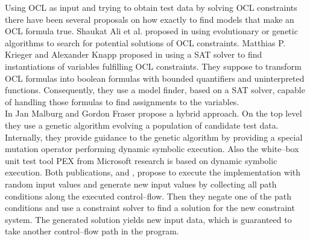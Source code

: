 \documentclass[runningheads,a4paper]{llncs}%
\begin{document}
Using OCL as input and trying to obtain test data by solving OCL constraints there have been several proposals on how exactly to find models that make an OCL formula true. Shaukat Ali et al. proposed in \cite{ali2011search} using evolutionary or genetic algorithms to search for potential solutions of OCL constraints. Matthias P. Krieger and Alexander Knapp proposed in \cite{krieger2008executingUnderspecifiedOCL} using a SAT solver to find instantiations of variables fulfilling OCL constraints. They suppose to transform OCL formulas into boolean formulas with bounded quantifiers and uninterpreted functions. Consequently, they use a model finder, based on a SAT solver, capable of handling those formulas to find assignments to the variables.\\%
In \cite{malburg2011combining} Jan Malburg and Gordon Fraser propose a hybrid approach. On the top level they use a genetic algorithm evolving a population of candidate test data. Internally, they provide guidance to the genetic algorithm by providing a special mutation operator performing dynamic symbolic execution. Also the white--box unit test tool PEX \cite{pex} from Microsoft\textsuperscript{\textregistered} research is based on dynamic symbolic execution. Both publications, \cite{malburg2011combining} and \cite{pex}, propose to execute the implementation with random input values and generate new input values by collecting all path conditions along the executed control--flow. Then they negate one of the path conditions and use a constraint solver to find a solution for the new constraint system. The generated solution yields new input data, which is guaranteed to take another control--flow path in the program.%
\end{document}
